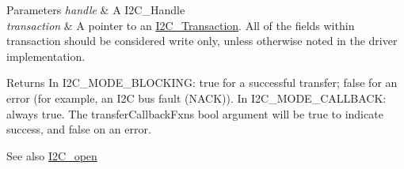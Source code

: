 \begin{DoxyParams}{Parameters}
{\em handle} & A I2\+C\+\_\+\+Handle\\
\hline
{\em transaction} & A pointer to an \hyperlink{struct_i2_c___transaction}{I2\+C\+\_\+\+Transaction}. All of the fields within transaction should be considered write only, unless otherwise noted in the driver implementation.\\
\hline
\end{DoxyParams}
\begin{DoxyReturn}{Returns}
In I2\+C\+\_\+\+M\+O\+D\+E\+\_\+\+B\+L\+O\+C\+K\+I\+N\+G\+: true for a successful transfer; false for an error (for example, an I2\+C bus fault (N\+A\+C\+K)). In I2\+C\+\_\+\+M\+O\+D\+E\+\_\+\+C\+A\+L\+L\+B\+A\+C\+K\+: always true. The transfer\+Callback\+Fxn\textquotesingle{}s bool argument will be true to indicate success, and false on an error.
\end{DoxyReturn}
\begin{DoxySeeAlso}{See also}
\hyperlink{_i2_c_8h_ae1aa99e1fee4517406018e10025cca0e}{I2\+C\+\_\+open} 
\end{DoxySeeAlso}
